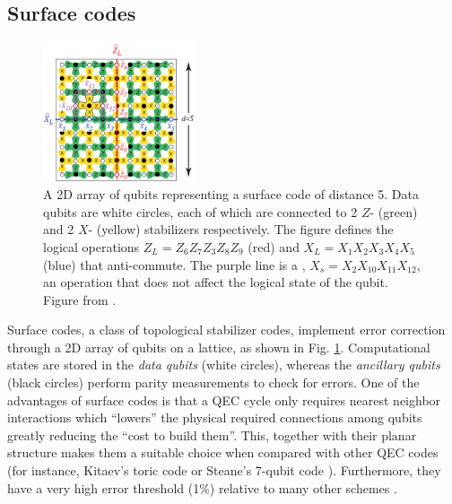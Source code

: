 \subsection{Surface codes}
\begin{figure}
  \centering
  \includegraphics[width=0.4\textwidth]{images/surface_code.png}
  \caption{A 2D array of qubits representing a surface code of distance 5. Data
    qubits are white circles, each of which are connected to 2 $Z$- (green)
    and 2 $X$- (yellow) stabilizers respectively. The figure defines the logical
    operations $Z_L = Z_6Z_7Z_3Z_8Z_9$ (red) and $X_L = X_1X_2X_3X_4X_5$ (blue)
    that anti-commute. The purple line is a ,
    $X_s = X_2 X_{10}X_{11} X_{12} $, an operation that does not affect the
    logical state of the qubit. Figure from \cite{fowler12_surfac_codes}.}
  \label{fig:surface_code}
\end{figure}

Surface codes, a class of topological stabilizer codes, implement error
correction through a 2D array of qubits on a lattice, as shown in Fig.
\ref{fig:surface_code}. Computational states are stored in the \textit{data
  qubits} (white circles), whereas the \textit{ancillary qubits} (black circles)
perform parity measurements to check for errors. One of the advantages of
surface codes is that a QEC cycle only requires nearest neighbor interactions
which ``lowers'' the physical required connections among qubits greatly
reducing the ``cost to build them''. This, together with their planar
structure makes them a suitable choice when compared with other QEC codes (for
instance, Kitaev's toric code \cite{Kitaev_2003} or Steane's 7-qubit code
\cite{Steane_1996_QEC}). Furthermore, they have a very high error threshold
(1\%) relative to many other schemes \cite{terhal15}.


